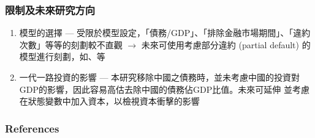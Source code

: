 \documentclass[mathserif]{beamer}
\begin{document}
\begin{frame}
    \frametitle{限制及未來研究方向}
        \begin{enumerate}
            \item 模型的選擇 --- 受限於模型設定，「債務/GDP」、「排除金融市場期間」、「違約次數」等等的刻劃較不直觀 $\rightarrow$ 未來可使用考慮部分違約 (partial default) 的模型進行刻劃，如\citet{Bi-08}、\citet{Arellano-23-partial-default}等
            \item 一代一路投資的影響 --- 本研究移除中國之債務時，並未考慮中國的投資對GDP的影響，因此容易高估去除中國的債務佔GDP比值。未來可延伸 \citet{Mendoza-Yue-12}並考慮在狀態變數中加入資本，以檢視資本衝擊的影響
        \end{enumerate}

\end{frame}

    \begin{frame}[allowframebreaks]
            \frametitle{References}
            
            
    \end{frame}
\end{document}
